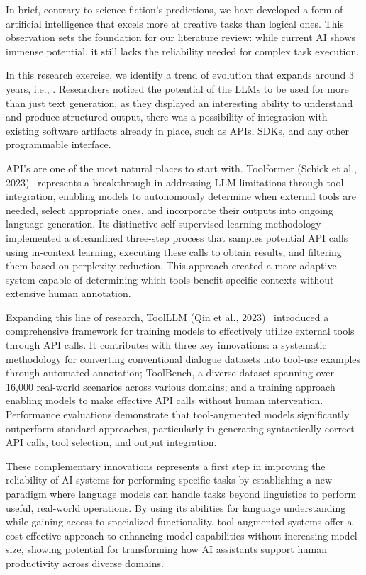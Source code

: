 \documentclass[journal,twoside,10pt]{IEEEtran}
\begin{document}
In brief, contrary to science fiction's predictions, we have developed a form of artificial intelligence that excels more at creative tasks than logical ones. This observation sets the foundation for our literature review: while current AI shows immense potential, it still lacks the reliability needed for complex task execution.

In this research exercise, we identify a trend of evolution that expands around 3 years, i.e., \cite{schick2023toolformer, qin2023toolllm}. Researchers noticed the potential of the LLMs to be used for more than just text generation, as they displayed an interesting ability to understand and produce structured output, there was a possibility of integration with existing software artifacts already in place, such as APIs, SDKs, and any other programmable interface.

API's are one of the most natural places to start with.  Toolformer (Schick et al., 2023)~\cite{schick2023toolformer} represents a breakthrough in addressing LLM limitations through tool integration, enabling models to autonomously determine when external tools are needed, select appropriate ones, and incorporate their outputs into ongoing language generation. Its distinctive self-supervised learning methodology implemented a streamlined three-step process that samples potential API calls using in-context learning, executing these calls to obtain results, and filtering them based on perplexity reduction. This approach created a more adaptive system capable of determining which tools benefit specific contexts without extensive human annotation.

Expanding this line of research, ToolLLM (Qin et al., 2023)~\cite{qin2023toolllm} introduced a comprehensive framework for training models to effectively utilize external tools through API calls. It contributes with three key innovations: a systematic methodology for converting conventional dialogue datasets into tool-use examples through automated annotation; ToolBench, a diverse dataset spanning over 16,000 real-world scenarios across various domains; and a training approach enabling models to make effective API calls without human intervention. Performance evaluations demonstrate that tool-augmented models significantly outperform standard approaches, particularly in generating syntactically correct API calls, tool selection, and output integration.

These complementary innovations represents a first step in improving the reliability of AI systems for performing specific tasks by establishing a new paradigm where language models can handle tasks beyond linguistics to perform useful, real-world operations. By using its abilities for language understanding while gaining access to specialized functionality, tool-augmented systems offer a cost-effective approach to enhancing model capabilities without increasing model size, showing potential for transforming how AI assistants support human productivity across diverse domains.
\end{document}

